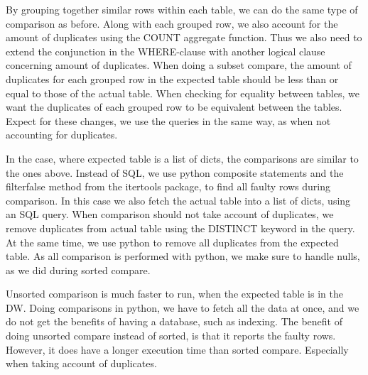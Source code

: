 
By grouping together similar rows within each table, we can do the same type of comparison as before. Along with each grouped row, we also account for the amount of duplicates using the COUNT aggregate function. Thus we also need to extend the conjunction in the WHERE-clause with another logical clause concerning amount of duplicates. When doing a subset compare, the amount of duplicates for each grouped row in the expected table should be less than or equal to those of the actual table. When checking for equality between tables, we want the duplicates of each grouped row to be equivalent between the tables. Expect for these changes, we use the queries in the same way, as when not accounting for duplicates.

In the case, where expected table is a list of dicts, the comparisons are similar to the ones above. Instead of SQL, we use python composite statements and the filterfalse method from the itertools package, to find all faulty rows during comparison. In this case we also fetch the actual table into a list of dicts, using an SQL query. When comparison should not take account of duplicates, we remove duplicates from actual table using the DISTINCT keyword in the query. At the same time, we use python to remove all duplicates from the expected table. As all comparison is performed with python, we make sure to handle nulls, as we did during sorted compare.

Unsorted comparison is much faster to run, when the expected table is in the DW. Doing comparisons in python, we have to fetch all the data at once, and we do not get the benefits of having a database, such as indexing. The benefit of doing unsorted compare instead of sorted, is that it reports the faulty rows. However, it does have a longer execution time than sorted compare. Especially when taking account of duplicates.


